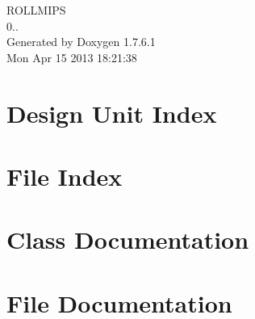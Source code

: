 \documentclass[a4paper]{book}
\begin{document}
\hypersetup{pageanchor=false,citecolor=blue}
\begin{titlepage}
\vspace*{7cm}
\begin{center}
{\Large \-R\-O\-L\-L\-M\-I\-P\-S \\[1ex]\large 0.. }\\
\vspace*{1cm}
{\large \-Generated by Doxygen 1.7.6.1}\\
\vspace*{0.5cm}
{\small Mon Apr 15 2013 18:21:38}\\
\end{center}
\end{titlepage}
\clearemptydoublepage
{}
\tableofcontents
\clearemptydoublepage
{}
\hypersetup{pageanchor=true,citecolor=blue}
\chapter{\-Design \-Unit \-Index}

\chapter{\-File \-Index}

\chapter{\-Class \-Documentation}














































\chapter{\-File \-Documentation}


\printindex
\end{document}
